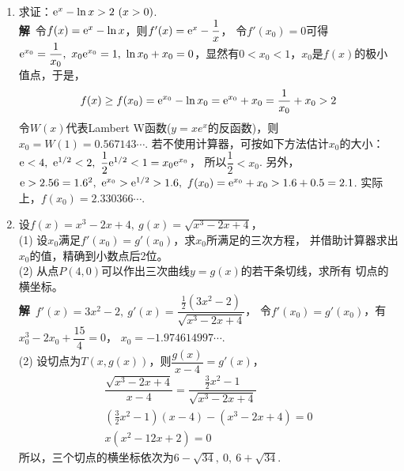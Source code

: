 \begin{enumerate}[label={【\textbf{例\thechapter.\arabic*}】},
 leftmargin=\inteval{\myenumleftmargin}pt,
 itemsep=\inteval{\myenumitempsep}pt,
 itemindent=\inteval{\myenumitemindent}pt]
\item 求证：$ \e^x-\ln x>2\ (x>0) $. \\
\textbf{解}\ 令$ f(x)=\mathrm{e}^x-\ln x $，则$ f'(x)=\mathrm{e}^x-\dfrac{1}{x} $，
令$ f'(x_0)=0 $可得$ \e^{x_0}=\dfrac{1}{x_0},\ x_0\e^{x_0}=1,\ 
\ln x_0+x_0=0 $，显然有$ 0<x_0<1 $，$ x_0 $是$ f(x) $的极小值点，于是，
\begin{align*}
    f(x)\geq f(x_0)=\mathrm{e}^{x_0}-\ln x_0=\mathrm{e}^{x_0}+x_0=\dfrac{1}{x_0}+x_0>2
\end{align*}
令$ W(x) $代表Lambert W函数($ y=xe^x $的反函数)，则$ x_0=W(1)=0.567143\cdots $.
若不使用计算器，可按如下方法估计$ x_0 $的大小：
$ \e<4 ,\ \e^{1/2}< 2,\ \dfrac{1}{2}\e^{1/2} <1=x_0\e^{x_0} $，
所以$ \dfrac{1}{2}<x_0 $. 另外，
$ \e>2.56=1.6^2,\ \e^{x_0}>\e^{1/2}>1.6,\ f(x_0)=\e^{x_0}+x_0
>1.6+0.5=2.1 $. 实际上，$ f(x_0)=2.330366\cdots $. 

\item  设$ f(x)=x^3-2x+4,\ g(x)=\sqrt{x^3-2x+4} $，\\
(1) 设$ x_0 $满足$ f'(x_0)=g'(x_0) $，求$ x_0 $所满足的三次方程，
并借助计算器求出$x_0$的值，精确到小数点后2位。\\
(2) 从点$ P(4,0) $可以作出三次曲线$ y=g(x) $的若干条切线，求所有
切点的横坐标。\\
\textbf{解}\ $ f'(x)=3x^2-2,\ g'(x)=
\dfrac{\frac{1}{2}(3x^2-2)}{\sqrt{x^3-2x+4}} $，
令$ f'(x_0)=g'(x_0) $，有$ x_0^3-2x_0+\dfrac{15}{4}=0 $，
$x_0=-1.974614997\cdots $. \\
(2) 设切点为$ T(x,g(x)) $，则$ \dfrac{g(x)}{x-4}=g'(x) $，
\begin{gather*}
    \dfrac{\sqrt{x^3-2x+4}}{x-4}=
    \dfrac{\frac{3}{2}x^2-1}{\sqrt{x^3-2x+4}} \\
    \left(\frac{3}{2}x^2-1\right)(x-4)-(x^3-2x+4)=0 \\
    x(x^2-12x + 2)=0
\end{gather*}
所以，三个切点的横坐标依次为$ 6-\sqrt{34},\ 0,\ 6+\sqrt{34}$.


\end{enumerate}

